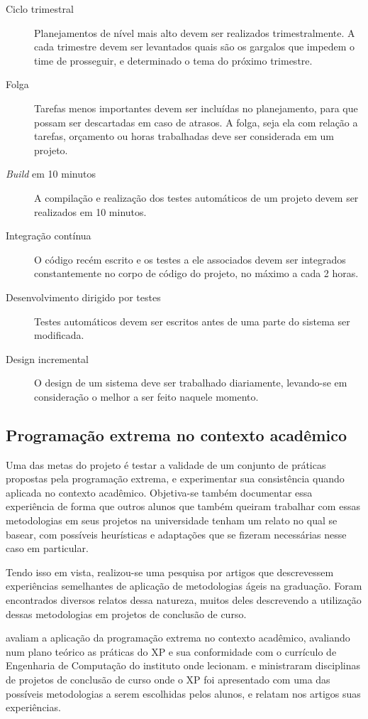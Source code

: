 \begin{description}
      \item[Ciclo trimestral]
      Planejamentos de nível mais alto devem ser realizados trimestralmente. A cada trimestre devem ser levantados quais são os gargalos que impedem o time de prosseguir, e determinado o tema do próximo trimestre.
      \item[Folga]
      Tarefas menos importantes devem ser incluídas no planejamento, para que possam ser descartadas em caso de atrasos. A folga, seja ela com relação a tarefas, orçamento ou horas trabalhadas deve ser considerada em um projeto.
      \item[\textit{Build} em 10 minutos]
      A compilação e realização dos testes automáticos de um projeto devem ser realizados em 10 minutos.
      \item[Integração contínua]
      O código recém escrito e os testes a ele associados devem ser integrados constantemente no corpo de código do projeto, no máximo a cada 2 horas.
      \item[Desenvolvimento dirigido por testes]
      Testes automáticos devem ser escritos antes de uma parte do sistema ser modificada.
      \item[Design incremental]
      O design de um sistema deve ser trabalhado diariamente, levando-se em consideração o melhor a ser feito naquele momento.
    \end{description}

	\subsection{Programação extrema no contexto acadêmico}\label{xp_e_universidade}
    Uma das metas do projeto é testar a validade de um conjunto de práticas propostas pela programação extrema, e experimentar sua consistência quando aplicada no contexto acadêmico. Objetiva-se também documentar essa experiência de forma que outros alunos que também queiram trabalhar com essas metodologias em seus projetos na universidade tenham um relato no qual se basear, com possíveis heurísticas e adaptações que se fizeram necessárias nesse caso em particular.

    Tendo isso em vista, realizou-se uma pesquisa por artigos que descrevessem experiências semelhantes de aplicação de metodologias ágeis na graduação. Foram encontrados diversos relatos dessa natureza, muitos deles descrevendo a utilização dessas metodologias em projetos de conclusão de curso.

     avaliam a aplicação da programação extrema no contexto acadêmico, avaliando num plano teórico as práticas do XP e sua conformidade com o currículo de Engenharia de Computação do instituto onde lecionam.  e  ministraram disciplinas de projetos de conclusão de curso onde o XP foi apresentado com uma das possíveis metodologias a serem escolhidas pelos alunos, e relatam nos artigos suas experiências.

